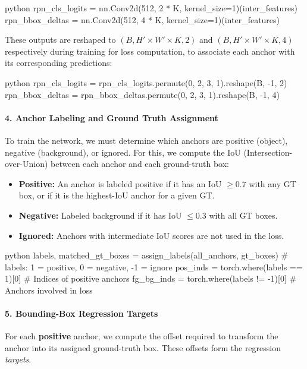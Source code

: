 \begin{enrichment}
    \begin{mintedbox}{python}
        rpn_cls_logits = nn.Conv2d(512, 2 * K, kernel_size=1)(inter_features)
        rpn_bbox_deltas = nn.Conv2d(512, 4 * K, kernel_size=1)(inter_features)
    \end{mintedbox}
    
    These outputs are reshaped to \((B, H' \times W' \times K, 2)\) and \((B, H' \times W' \times K, 4)\) respectively during training for loss computation, to associate each anchor with its corresponding predictions:
    \begin{mintedbox}{python}
        rpn_cls_logits = rpn_cls_logits.permute(0, 2, 3, 1).reshape(B, -1, 2)
        rpn_bbox_deltas = rpn_bbox_deltas.permute(0, 2, 3, 1).reshape(B, -1, 4)
    \end{mintedbox}
    
    \paragraph{4. Anchor Labeling and Ground Truth Assignment}
    To train the network, we must determine which anchors are positive (object), negative (background), or ignored. For this, we compute the IoU (Intersection-over-Union) between each anchor and each ground-truth box:
    \begin{itemize}
        \item \textbf{Positive:} An anchor is labeled positive if it has an IoU \(\ge 0.7\) with any GT box, or if it is the highest-IoU anchor for a given GT.
        \item \textbf{Negative:} Labeled background if it has IoU \(\le 0.3\) with all GT boxes.
        \item \textbf{Ignored:} Anchors with intermediate IoU scores are not used in the loss.
    \end{itemize}
    
    \begin{mintedbox}{python}
        labels, matched_gt_boxes = assign_labels(all_anchors, gt_boxes)
        # labels: 1 = positive, 0 = negative, -1 = ignore
        pos_inds = torch.where(labels == 1)[0]  # Indices of positive anchors
        fg_bg_inds = torch.where(labels != -1)[0]  # Anchors involved in loss
    \end{mintedbox}
    
    \paragraph{5. Bounding-Box Regression Targets}
    For each \textbf{positive} anchor, we compute the offset required to transform the anchor into its assigned ground-truth box. These offsets form the regression \emph{targets}.
    

\end{enrichment}
